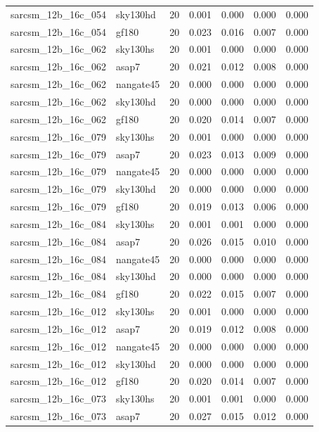 \begin{tabular}{llrrrrr}
sarcsm\_12b\_16c\_054 & sky130hd & 20 & 0.001 & 0.000 & 0.000 & 0.000 \\
sarcsm\_12b\_16c\_054 & gf180 & 20 & 0.023 & 0.016 & 0.007 & 0.000 \\
sarcsm\_12b\_16c\_062 & sky130hs & 20 & 0.001 & 0.000 & 0.000 & 0.000 \\
sarcsm\_12b\_16c\_062 & asap7 & 20 & 0.021 & 0.012 & 0.008 & 0.000 \\
sarcsm\_12b\_16c\_062 & nangate45 & 20 & 0.000 & 0.000 & 0.000 & 0.000 \\
sarcsm\_12b\_16c\_062 & sky130hd & 20 & 0.000 & 0.000 & 0.000 & 0.000 \\
sarcsm\_12b\_16c\_062 & gf180 & 20 & 0.020 & 0.014 & 0.007 & 0.000 \\
sarcsm\_12b\_16c\_079 & sky130hs & 20 & 0.001 & 0.000 & 0.000 & 0.000 \\
sarcsm\_12b\_16c\_079 & asap7 & 20 & 0.023 & 0.013 & 0.009 & 0.000 \\
sarcsm\_12b\_16c\_079 & nangate45 & 20 & 0.000 & 0.000 & 0.000 & 0.000 \\
sarcsm\_12b\_16c\_079 & sky130hd & 20 & 0.000 & 0.000 & 0.000 & 0.000 \\
sarcsm\_12b\_16c\_079 & gf180 & 20 & 0.019 & 0.013 & 0.006 & 0.000 \\
sarcsm\_12b\_16c\_084 & sky130hs & 20 & 0.001 & 0.001 & 0.000 & 0.000 \\
sarcsm\_12b\_16c\_084 & asap7 & 20 & 0.026 & 0.015 & 0.010 & 0.000 \\
sarcsm\_12b\_16c\_084 & nangate45 & 20 & 0.000 & 0.000 & 0.000 & 0.000 \\
sarcsm\_12b\_16c\_084 & sky130hd & 20 & 0.000 & 0.000 & 0.000 & 0.000 \\
sarcsm\_12b\_16c\_084 & gf180 & 20 & 0.022 & 0.015 & 0.007 & 0.000 \\
sarcsm\_12b\_16c\_012 & sky130hs & 20 & 0.001 & 0.000 & 0.000 & 0.000 \\
sarcsm\_12b\_16c\_012 & asap7 & 20 & 0.019 & 0.012 & 0.008 & 0.000 \\
sarcsm\_12b\_16c\_012 & nangate45 & 20 & 0.000 & 0.000 & 0.000 & 0.000 \\
sarcsm\_12b\_16c\_012 & sky130hd & 20 & 0.000 & 0.000 & 0.000 & 0.000 \\
sarcsm\_12b\_16c\_012 & gf180 & 20 & 0.020 & 0.014 & 0.007 & 0.000 \\
sarcsm\_12b\_16c\_073 & sky130hs & 20 & 0.001 & 0.001 & 0.000 & 0.000 \\
sarcsm\_12b\_16c\_073 & asap7 & 20 & 0.027 & 0.015 & 0.012 & 0.000 \\

\end{tabular}
